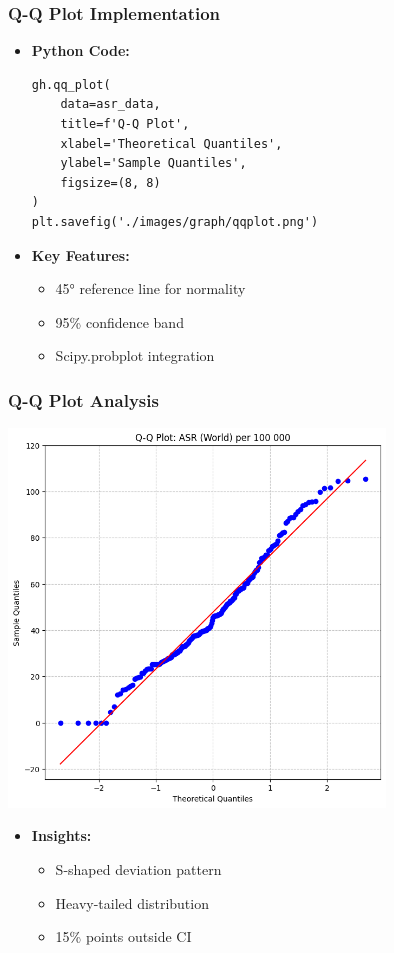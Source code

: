 \documentclass{beamer}
\begin{document}
\begin{frame}[fragile]
    \frametitle{Q-Q Plot Implementation}
    \begin{itemize}
        \item \textbf{Python Code:}
        \begin{lstlisting}
gh.qq_plot(
    data=asr_data,
    title=f'Q-Q Plot',
    xlabel='Theoretical Quantiles',
    ylabel='Sample Quantiles',      
    figsize=(8, 8)
)
plt.savefig('./images/graph/qqplot.png')
        \end{lstlisting}
        
        \item \textbf{Key Features:}
        \begin{itemize}
            \item 45° reference line for normality
            \item 95\% confidence band
            \item Scipy.probplot integration
        \end{itemize}
    \end{itemize}
\end{frame}

\begin{frame}
    \frametitle{Q-Q Plot Analysis}
    \centering
    \includegraphics[width=0.75\textwidth,height=0.6\textheight,keepaspectratio]{./images/graph/qqplot.png}
    \vspace{-0.5em}  %
    \begin{itemize}
        \item \textbf{Insights:}
        \begin{itemize}
            \item S-shaped deviation pattern
            \item Heavy-tailed distribution
            \item 15\% points outside CI
        \end{itemize}
    \end{itemize}
\end{frame}
\end{document}
